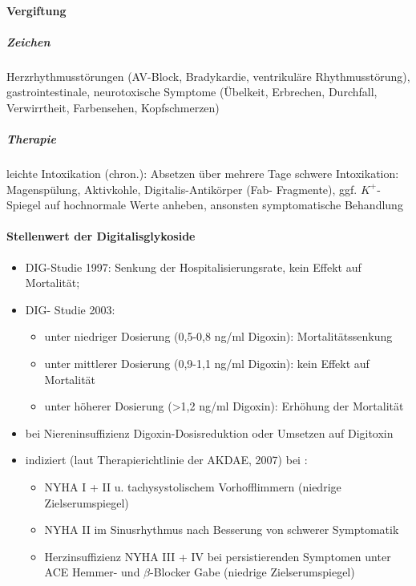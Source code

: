 \documentclass[10pt,a4paper]{report}
\begin{document}
\paragraph{Vergiftung}
\subparagraph{Zeichen} Herzrhythmusstörungen (AV-Block, Bradykardie, ventrikuläre Rhythmusstörung), gastrointestinale, neurotoxische Symptome (Übelkeit, Erbrechen, Durchfall, Verwirrtheit, Farbensehen, Kopfschmerzen)
\subparagraph{Therapie}leichte Intoxikation (chron.): Absetzen über mehrere Tage schwere Intoxikation:	Magenspülung, Aktivkohle, Digitalis-Antikörper (Fab-				Fragmente), ggf. $K^+$-Spiegel auf hochnormale Werte anheben, ansonsten symptomatische Behandlung
\paragraph{Stellenwert der Digitalisglykoside}
\begin{itemize}
	\item DIG-Studie 1997: Senkung der Hospitalisierungsrate, kein Effekt auf Mortalität;
	\item DIG- Studie 2003:
	\begin{itemize}
		\item unter niedriger Dosierung (0,5-0,8 ng/ml Digoxin): Mortalitätssenkung 
		\item unter mittlerer Dosierung (0,9-1,1 ng/ml Digoxin): kein Effekt auf Mortalität 
		\item unter höherer Dosierung (>1,2 ng/ml Digoxin): Erhöhung der Mortalität 
	\end{itemize}

	\item bei Niereninsuffizienz Digoxin-Dosisreduktion oder Umsetzen auf Digitoxin
	\item indiziert (laut Therapierichtlinie der AKDAE, 2007) bei :
	\begin{itemize}
		\item NYHA I + II u. tachysystolischem Vorhofflimmern (niedrige Zielserumspiegel)
		\item NYHA II im Sinusrhythmus nach Besserung von schwerer Symptomatik
		\item Herzinsuffizienz NYHA III + IV bei persistierenden Symptomen unter ACE Hemmer- und $\beta$-Blocker Gabe (niedrige Zielserumspiegel)
	\end{itemize}
\end{itemize}
\end{document}
